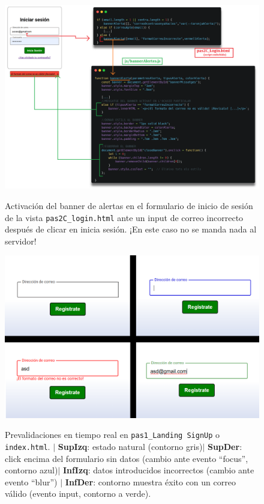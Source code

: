 \documentclass[a4paper,12pt]{report}
\begin{document}
		\FloatBarrier
		\setlength{\belowcaptionskip}{3pt}
		\begin{figure}[H]
			\centering
			\caption{Activación del banner de alertas en el formulario de inicio de sesión de la vista \texttt{pas2C\_login.html} ante un input de correo incorrecto después de clicar en inicia sesión. ¡En este caso no se manda nada al servidor!}
			\includegraphics[width=.8\linewidth]{img/activacioBannerAlertesLoginCorreu}
			\label{fig:activacioBannerAlertesLoginCorreu}
		\end{figure}
		\FloatBarrier
		
	
	
		
		
		\FloatBarrier
		\setlength{\belowcaptionskip}{3pt}
		\begin{figure}[H]
			\centering
			\caption{Prevalidaciones en tiempo real en \texttt{pas1\_Landing SignUp} o \texttt{index.html}. $|$ \textbf{SupIzq}: estado natural (contorno gris)$|$ \textbf{SupDer}: click encima del formulario sin datos (cambio ante evento ``focus'', contorno azul)$|$ \textbf{InfIzq}: datos introducidos incorrectos (cambio ante evento ``blur'') $|$ \textbf{InfDer}: contorno muestra éxito con un correo válido (evento input, contorno a verde).}
			\includegraphics[width=.9\linewidth]{img/logicaInputBlurSignup}
			\label{fig:logicaInputBlurSignup}
		\end{figure}
		\FloatBarrier
		
\end{document}
